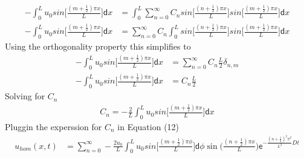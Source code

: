 \documentclass[a4paper]{article}
\begin{document}
\begin{align*}
 -\int_{0}^{L} u_{0} sin\bigg[\frac{(m+\frac{1}{2}) \pi x}{L} \bigg] \mathsf{d}x &= \int_{0}^{L} \sum_{n=0}^{\infty}C_{n}sin\bigg[\frac{(n+\frac{1}{2}) \pi x}{L} \bigg] sin\bigg[\frac{(m+\frac{1}{2}) \pi x}{L} \bigg] \mathsf{d}x \\
 -\int_{0}^{L} u_{0} sin\bigg[\frac{(m+\frac{1}{2}) \pi x}{L} \bigg] \mathsf{d}x &= \sum_{n=0}^{\infty}C_{n} \int_{0}^{L} sin\bigg[\frac{(n+\frac{1}{2}) \pi x}{L} \bigg] sin\bigg[\frac{(m+\frac{1}{2}) \pi x}{L} \bigg] \mathsf{d}x 
\end{align*}
Using the orthogonality property this simplifies to
\begin{align*}
 -\int_{0}^{L} u_{0} sin\bigg[\frac{(m+\frac{1}{2}) \pi x}{L} \bigg] \mathsf{d}x &= \sum_{n=0}^{\infty}C_{n} \frac{L}{2} \delta_{n,m} \\
 -\int_{0}^{L} u_{0} sin\bigg[\frac{(m+\frac{1}{2}) \pi x}{L} \bigg] \mathsf{d}x &= C_{n}\frac{L}{2} 
\end{align*}
Solving for $C_{n}$
\begin{align}
  C_{n} = - \frac{2}{L} \int_{0}^{L} u_{0} sin\bigg[\frac{(m+\frac{1}{2}) \pi x}{L} \bigg] \mathsf{d}x 
\end{align}
Pluggin the experssion for $C_{n}$ in Equation (12) 
\begin{align}
  u_{hom}(x, t) &= \sum_{n=0}^{\infty} -\frac{2u_{0}}{L} \int_{0}^{L} u_{0} sin\bigg[\frac{(m+\frac{1}{2}) \pi \phi}{L} \bigg] \mathsf{d}\phi \sin \bigg(\frac{(n+\frac{1}{2}) \pi x}{L} \bigg) \mathsf{e}^{-\frac{(n+\frac{1}{2})^{2}\pi^{2}}{L^{2}} D t} 
\end{align}
\end{document}
